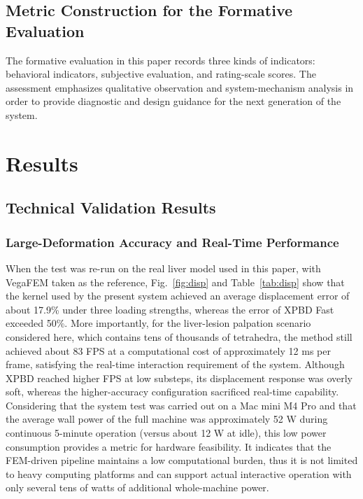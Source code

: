 \documentclass{ieeeaccess}
\begin{document}
\subsection{Metric Construction for the Formative Evaluation}
The formative evaluation in this paper records three kinds of indicators: behavioral indicators, subjective evaluation, and rating-scale scores. The assessment emphasizes qualitative observation and system-mechanism analysis in order to provide diagnostic and design guidance for the next generation of the system.

\section{Results}
\subsection{Technical Validation Results}
\subsubsection{Large-Deformation Accuracy and Real-Time Performance}
When the test was re-run on the real liver model used in this paper, with VegaFEM taken as the reference, Fig.~\ref{fig:disp} and Table~\ref{tab:disp} show that the kernel used by the present system achieved an average displacement error of about 17.9\% under three loading strengths, whereas the error of XPBD Fast exceeded 50\%. More importantly, for the liver-lesion palpation scenario considered here, which contains tens of thousands of tetrahedra, the method still achieved about 83 FPS at a computational cost of approximately 12 ms per frame, satisfying the real-time interaction requirement of the system. Although XPBD reached higher FPS at low substeps, its displacement response was overly soft, whereas the higher-accuracy configuration sacrificed real-time capability. Considering that the system test was carried out on a Mac mini M4 Pro and that the average wall power of the full machine was approximately 52 W during continuous 5-minute operation (versus about 12 W at idle), this low power consumption provides a metric for hardware feasibility. It indicates that the FEM-driven pipeline maintains a low computational burden, thus it is not limited to heavy computing platforms and can support actual interactive operation with only several tens of watts of additional whole-machine power.
\end{document}
